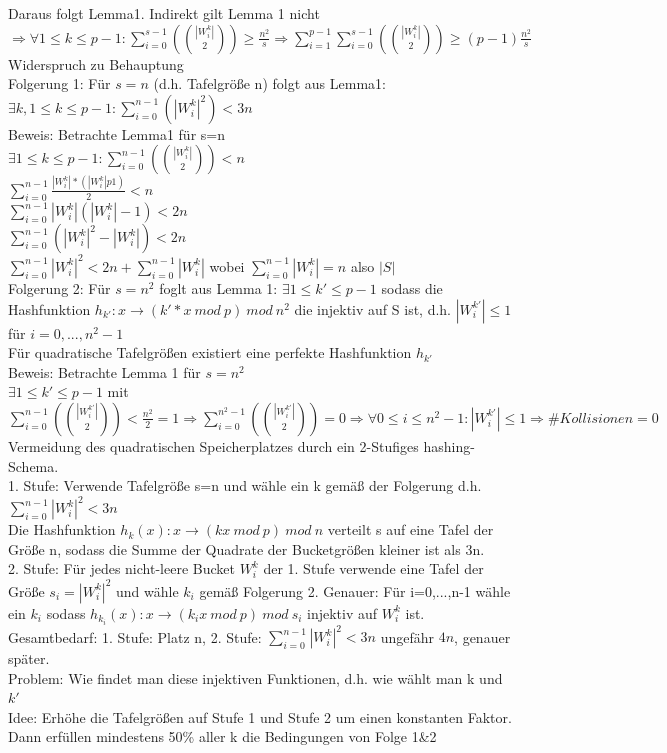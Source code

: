 \documentclass[a4paper]{article}
\begin{document}
Daraus folgt Lemma1. Indirekt gilt Lemma 1 nicht $\Rightarrow \forall 1\leq k\leq p-1: \sum_{i=0}^{s-1}({|W_i^k| \choose 2}) \geq \frac{n^2}{s}\Rightarrow \sum_{i=1}^{p-1}\sum_{i=0}^{s-1}({|W_i^k| \choose 2}) \geq (p-1)\frac{n^2}{s} $Widerspruch zu Behauptung\\
Folgerung 1: Für $s=n$ (d.h. Tafelgröße n) folgt aus Lemma1: $\exists k, 1\leq k\leq p-1: \sum_{i=0}^{n-1}(|W_i^k|^2)<3n$\\
Beweis: Betrachte Lemma1 für s=n\\
$\exists 1\leq k\leq p-1 :\sum_{i=0}^{n-1}({|W_i^k| \choose 2}) < n$\\
$\sum_{i=0}^{n-1}\frac{|W_i^k|*(|W_i^k|p1)}{2} < n$\\
$\sum_{i=0}^{n-1}|W_i^k|(|W_i^k|-1) <2n$\\
$\sum_{i=0}^{n-1}(|W_i^k|^2-|W_i^k|) <2n$\\
$\sum_{i=0}^{n-1}|W_i^k|^2 < 2n+\sum_{i=0}^{n-1} |W_i^k|$ wobei $\sum_{i=0}^{n-1} |W_i^k| = n$ also $|S|$\\
Folgerung 2: Für $s=n^2$ foglt aus Lemma 1: $\exists 1\leq k' \leq p-1$ sodass die Hashfunktion $h_{k'}:x\rightarrow (k'*x\ mod\ p)\ mod\ n^2$ die injektiv auf S ist, d.h. $|W_i^{k'}|\leq 1$ für $i=0,...,n^2-1$\\
Für quadratische Tafelgrößen existiert eine perfekte Hashfunktion $h_{k'}$\\
Beweis: Betrachte Lemma 1 für $s=n^2$\\
$\exists 1\leq k'\leq p-1$ mit $\sum_{i=0}^{n-1}({|W_i^{k'}| \choose 2}) < \frac{n^2}{2}=1\Rightarrow \sum_{i=0}^{n^2-1}({|W_i^{k'}| \choose 2}) = 0 \Rightarrow \forall 0\leq i \leq n^2-1: |W_i^{k'}|\leq 1 \Rightarrow \#Kollisionen=0$\\
Vermeidung des quadratischen Speicherplatzes durch ein 2-Stufiges hashing-Schema.\\
1. Stufe: Verwende Tafelgröße s=n und wähle ein k gemäß der Folgerung d.h. $\sum_{i=0}^{n-1}|W_i^k|^2<3n$\\
Die Hashfunktion $h_k(x):x\rightarrow (kx\ mod\ p)\ mod\ n$ verteilt s auf eine Tafel der Größe n, sodass die Summe der Quadrate der Bucketgrößen kleiner ist als 3n.\\
2. Stufe: Für jedes nicht-leere Bucket $W_i^k$ der 1. Stufe verwende eine Tafel der Größe $s_i=|W_i^k|^2$ und wähle $k_i$ gemäß Folgerung 2. Genauer: Für i=0,...,n-1 wähle ein $k_i$ sodass $h_{k_i}(x): x\rightarrow (k_ix\ mod\ p)\ mod\ s_i$ injektiv auf $W_i^k$ ist.\\
Gesamtbedarf: 1. Stufe: Platz n, 2. Stufe: $\sum_{i=0}^{n-1}|W_i^k|^2 < 3n$ ungefähr $4n$, genauer später.\\
Problem: Wie findet man diese injektiven Funktionen, d.h. wie wählt man k und $k'$\\
Idee: Erhöhe die Tafelgrößen auf Stufe 1 und Stufe 2 um einen konstanten Faktor. Dann erfüllen mindestens 50\% aller k die Bedingungen von Folge 1\&2\\
\end{document}
